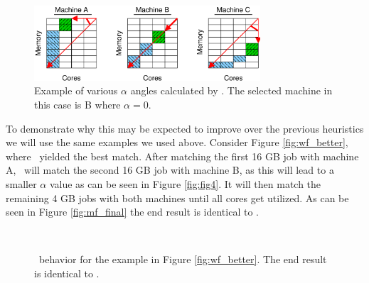 \begin{figure}\centering
	\includegraphics[width=0.75\textwidth]{figures/fig3.eps}
\caption{Example of various $\alpha$ angles calculated by \mif. The
selected machine in this case is B where $\alpha=0$.}
\label{fig:fig3}
\end{figure}

To demonstrate why this may be expected to improve over the previous
heuristics we will use the same examples we used above.
Consider Figure \ref{fig:wf_better}, where \wof\ yielded the best
match.
After matching the first 16 GB job with machine A, \mif\ will 
match the second 16 GB job with machine B, as this will lead to a
smaller $\alpha$ value as can be seen in Figure \ref{fig:fig4}.
It will then match the remaining 4 GB jobs with both machines
until all cores get utilized.
As can be seen in Figure \ref{fig:mf_final} the end result is identical
to \wof.

\begin{figure}\centering
{}
~~~~
\caption{\mif\ behavior for the example in Figure \ref{fig:wf_better}.
  The end result is identical to \wof.}
\end{figure}


